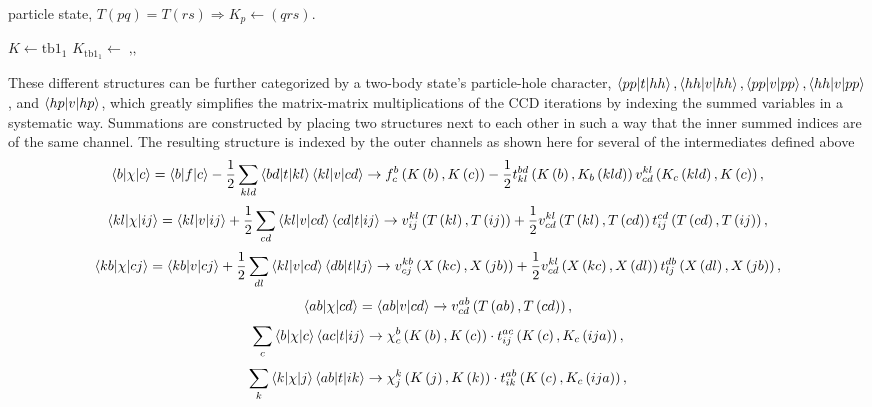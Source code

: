   particle state, $T\left( pq\right)=T\left( rs\right)\Rightarrow
  K_{p}\gets\left( qrs\right)$.
\begin{svgraybox}
  \begin{algorithmic}
     
     \State $K\gets\text{tb1}_{1}$
    \State
    $K_{\text{tb1}_{1}}\gets\mathop{\text{tb1}_{2},\text{tb2}_{1},\text{tb2}_{2}}$
    \EndFor \EndFor \EndFor
  \end{algorithmic}
\end{svgraybox}
  These different structures can be further categorized by a two-body
  state's particle-hole character, $\braket{pp| t |hh}, \braket{hh| v
    |hh}, \braket{pp| v |pp}, \braket{hh| v |pp}$, and $\braket{hp| v
    |hp}$, which greatly simplifies the matrix-matrix multiplications
  of the CCD iterations by indexing the summed variables in a
  systematic way. Summations are constructed by placing two
  structures next to each other in such a way that the inner summed
  indices are of the same channel. The resulting structure is indexed
  by the outer channels as shown here for several of the intermediates defined above
  \[
  \braket{b| \chi |c} = \braket{b|f|c} - \frac{1}{2} \sum_{kld}\braket{bd|t|kl} \braket{kl|v|cd} \rightarrow f_{c}^{b}\left(
  K\left( b\right),K\left( c\right)\right) -\frac{1}{2}t_{kl}^{bd}\left( K\left( b\right),K_{b}\left(kld\right)\right) v_{cd}^{kl}
\left( K_{c}\left(kld\right),K\left( c\right)\right),
\]
\[
\braket{kl| \chi |ij} = \braket{kl|v|ij} + \frac{1}{2} \sum_{cd}
  \braket{kl|v|cd} \braket{cd|t|ij} \rightarrow v_{ij}^{kl}\left(
  T\left( kl\right),T\left( ij\right)\right)+ 
  \frac{1}{2}v_{cd}^{kl}\left( T\left( kl\right),T\left(
  cd\right)\right) t_{ij}^{cd}\left( T\left( cd\right),T\left(
  ij\right)\right),
\]
\[
\braket{kb| \chi |cj} = \braket{kb|v|cj} +\frac{1}{2} \sum_{dl} \braket{kl|v|cd} \braket{db|t|lj} \rightarrow
  v_{cj}^{kb}\left( X\left( kc\right),X\left( jb\right)\right)+\frac{1}{2}v_{cd}^{kl}\left( X\left( kc\right),X\left(
  dl\right)\right) t_{lj}^{db}\left( X\left( dl\right),X\left(jb\right)\right),
\]
\[
\braket{ab| \chi |cd} = \braket{ab|v|cd}
  \rightarrow v_{cd}^{ab}\left( T\left( ab\right),T\left(
  cd\right)\right),
\]
\[
\sum_{c} \braket{b| \chi |c} \braket{ac| t |ij}
  \rightarrow \chi_{c}^{b}\left( K\left( b\right),K\left(
  c\right)\right)\cdot t_{ij}^{ac}\left( K\left( c\right), K_{c}\left(
  ija\right)\right),
\]
\[
\sum_{k} \braket{k| \chi |j} \braket{ab| t |ik}
  \rightarrow \chi_{j}^{k}\left( K\left( j\right),K\left(
  k\right)\right)\cdot t_{ik}^{ab}\left( K\left( c\right), K_{c}\left(
  ija\right)\right),
\] 
